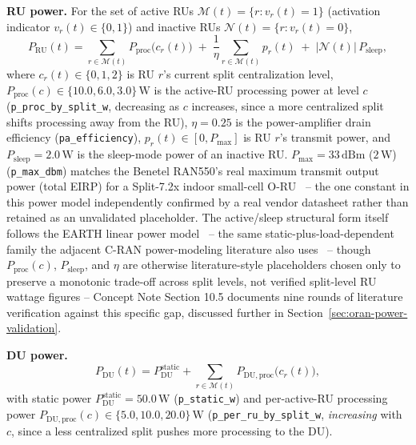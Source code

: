 \textbf{RU power.} For the set of active RUs $\mathcal{M}(t) = \{r : v_r(t) = 1\}$
(activation indicator $v_r(t) \in \{0,1\}$) and inactive RUs
$\mathcal{N}(t) = \{r : v_r(t) = 0\}$,
\begin{equation}
  P_{\mathrm{RU}}(t) = \sum_{r \in \mathcal{M}(t)} P_{\mathrm{proc}}\big(c_r(t)\big) \; + \; \frac{1}{\eta}\sum_{r \in \mathcal{M}(t)} p_r(t) \; + \; |\mathcal{N}(t)|\, P_{\mathrm{sleep}},
  \label{eq:oran-ru-power}
\end{equation}
where $c_r(t) \in \{0,1,2\}$ is RU $r$'s current split centralization level,
$P_{\mathrm{proc}}(c) \in \{10.0, 6.0, 3.0\}\,\mathrm{W}$ is the active-RU
processing power at level $c$ (\texttt{p\_proc\_by\_split\_w}, decreasing
as $c$ increases, since a more centralized split shifts processing away
from the RU), $\eta = 0.25$ is the power-amplifier drain efficiency
(\texttt{pa\_efficiency}), $p_r(t) \in [0, P_{\max}]$ is RU $r$'s transmit
power, and $P_{\mathrm{sleep}} = 2.0\,\mathrm{W}$ is the sleep-mode power
of an inactive RU. $P_{\max} = 33\,\mathrm{dBm}$ ($2\,\mathrm{W}$)
(\texttt{p\_max\_dbm}) matches the Benetel RAN550's real maximum transmit
output power (total EIRP) for a Split-7.2x indoor small-cell
O-RU~\cite{benetel2024ran550} -- the one constant in this power model
independently confirmed by a real vendor datasheet rather than retained as
an unvalidated placeholder. The active/sleep structural form itself
follows the EARTH linear power model~\cite{auer2011earth} -- the same
static-plus-load-dependent family the adjacent C-RAN power-modeling
literature also uses~\cite{alzubaedi2019cran} -- though
$P_{\mathrm{proc}}(c)$, $P_{\mathrm{sleep}}$, and $\eta$ are otherwise
literature-style placeholders chosen only to preserve a monotonic
trade-off across split levels, not verified split-level RU wattage figures
-- Concept Note Section 10.5 documents nine rounds of literature
verification against this specific gap, discussed further in
Section~\ref{sec:oran-power-validation}.

\textbf{DU power.}
\begin{equation}
  P_{\mathrm{DU}}(t) = P_{\mathrm{DU}}^{\mathrm{static}} + \sum_{r \in \mathcal{M}(t)} P_{\mathrm{DU,proc}}\big(c_r(t)\big),
  \label{eq:oran-du-power}
\end{equation}
with static power $P_{\mathrm{DU}}^{\mathrm{static}} = 50.0\,\mathrm{W}$
(\texttt{p\_static\_w}) and per-active-RU processing power
$P_{\mathrm{DU,proc}}(c) \in \{5.0, 10.0, 20.0\}\,\mathrm{W}$
(\texttt{p\_per\_ru\_by\_split\_w}, \emph{increasing} with $c$, since a
less centralized split pushes more processing to the DU).

